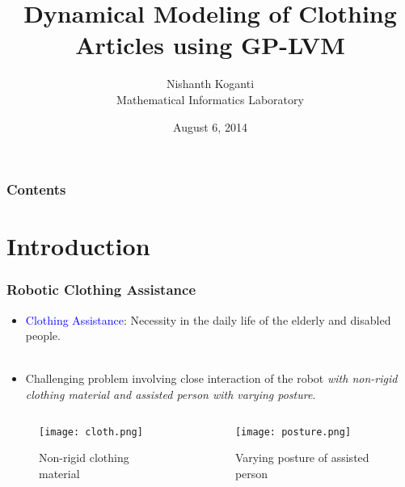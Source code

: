 \documentclass[10pt,handout]{beamer}
\title[Lab Retreat]{Dynamical Modeling of Clothing Articles using GP-LVM}
\author[Nishanth]{Nishanth Koganti\\Mathematical Informatics Laboratory}
\institute[NAIST]{Nara Institute of Science and Technology}
\date{August 6, 2014}
\begin{document}
\frame{\titlepage}

\begin{frame}
  \frametitle{Contents}
  \tableofcontents
\end{frame}


\section{Introduction}

\begin{frame}
\frametitle{Robotic Clothing Assistance}

\begin{itemize}
  \item \textcolor{blue}{Clothing Assistance}: Necessity in the daily life of the elderly and disabled people.\\~\\
  \item Challenging problem involving close interaction of the robot \emph{with non-rigid clothing material and assisted person with varying posture}.  
\end{itemize}

\begin{columns}
  \begin{column}[t]{0.48\textwidth}
    \centering
    \begin{figure}
      \caption*{Non-rigid clothing material}
      \texttt{[image: cloth.png]}
    \end{figure}
  \end{column}
  \begin{column}[t]{0.48\textwidth}
    \centering
    \begin{figure}
      \caption*{Varying posture of assisted person}
      \texttt{[image: posture.png]}
    \end{figure}
  \end{column}
\end{columns}

\end{frame}
\end{document}
